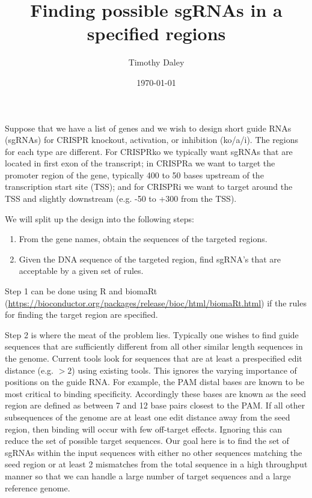 \documentclass{article}[12pt]
\date{\today}
\author{Timothy Daley}
\title{Finding possible sgRNAs in a specified regions}
\begin{document}
\maketitle

Suppose that we have a list of genes and we wish to
design short guide RNAs (sgRNAs) for CRISPR knockout,
activation, or inhibition (ko/a/i).  The regions for each type are 
different.  For CRISPRko we typically want sgRNAs that are
located in first exon of the transcript; in CRISPRa we want to
target the promoter region of the gene, typically 400 to 50
bases upstream of the transcription start site (TSS); and
for CRISPRi we want to target around the TSS and 
slightly downstream (e.g. -50 to +300 from the TSS).

We will split up the design into the following steps:
\begin{enumerate}
\item From the gene names, obtain the sequences of the 
targeted regions.  
\item Given the DNA sequence of the targeted region,
find sgRNA's that are acceptable by a given set of rules.
\end{enumerate}

Step 1 can be done using R and biomaRt 
(\url{https://bioconductor.org/packages/release/bioc/html/biomaRt.html})
if the rules for finding the target region are specified.

Step 2 is where the meat of the problem lies.
Typically one wishes to find guide sequences that are sufficiently
different from all other similar length sequences in the genome.
Current tools look for sequences that are at least a prespecified
edit distance (e.g. $> 2$) using existing tools.  
This ignores the varying importance of positions on the guide RNA.
For example, the PAM distal bases are known to be
most critical to binding specificity.  Accordingly these bases are
known as the seed region are defined as between 7 and 12 base
pairs closest to the PAM.  
If all other subsequences of the genome are at least one edit distance away
from the seed region, then binding will occur with few off-target effects.
Ignoring this can reduce the set of possible target sequences.
Our goal here is to find the set of sgRNAs within the
input sequences with either no other sequences matching the
seed region or at least 2 mismatches from the total sequence
in a high throughput manner so that we can handle a large number of
target sequences and a large reference genome.
\end{document}
